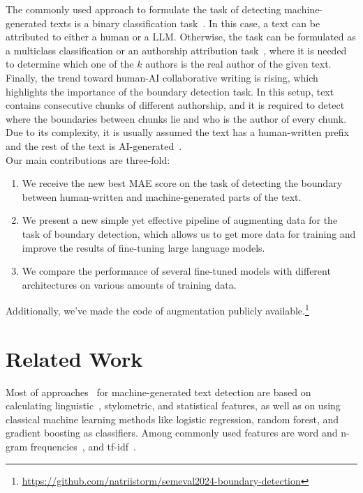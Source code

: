\documentclass[11pt]{article}
\begin{document}
The commonly used approach to formulate the task of detecting machine-generated texts is a binary classification task~\cite{jawahar-etal-2020-automatic}. In this case, a text can be attributed to  either a human or a LLM. Otherwise, the task can be formulated as a multiclass classification or an authorship attribution task~\cite{uchendu-etal-2020-authorship}, where it is needed to determine which one of the $k$ authors is the real author of the given text.
Finally, the trend toward human-AI collaborative writing is rising, which highlights the importance of the boundary detection task. In this setup, text contains consecutive chunks of different authorship, and it is required to detect where the boundaries between chunks lie and who is the author of every chunk. Due to its complexity, it is usually assumed the text has a human-written prefix and the rest of the text is AI-generated~\cite{dugan2022real, Cutler2021AutomaticDO, kushnareva2023artificial}. \\
Our main contributions are three-fold:
\begin{enumerate}
    \item  We receive the new best MAE score on the task of detecting the boundary between human-written and machine-generated parts of the text.
    \item  We present a new simple yet effective pipeline of augmenting data for the task of boundary detection, which allows us to get more data for training and improve the results of fine-tuning large language models.
    \item We compare the performance of several fine-tuned models with different architectures on various amounts of training data.
\end{enumerate}

Additionally, we've made the code of augmentation publicly  available.\footnote{\url{https://github.com/natriistorm/semeval2024-boundary-detection}}

\section{Related Work}

Most of approaches~\cite{jawahar-etal-2020-automatic} for machine-generated text detection are based on calculating linguistic~\cite{Frhling2021FeaturebasedDO}, stylometric, and statistical features, as well as on using classical machine learning methods like logistic regression, random forest, and gradient boosting as classifiers. Among commonly used features are word and n-gram frequencies~\cite{manjavacas-etal-2017-assessing}, and tf-idf~\cite{solaiman2019release}.
\end{document}

